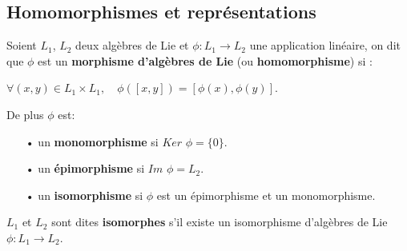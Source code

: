 \documentclass[a4paper,openany,12pt]{report}
\theoremstyle{break}
{\theorembodyfont{\upshape}
\newtheorem*{rmq}{Remarque :}
\newtheorem*{prv}{Preuve :}
\newtheorem*{ex}{Exemples :}
\newtheorem*{exe}{Exemple : }
\newtheorem*{nota}{Notation :}
\newtheorem*{dem}{D\'emonstration :}}
\begin{document}
\begin{ex}
\end{ex}

\subsection{Homomorphismes et représentations}

\begin{df}
Soient $L_{1}$, $L_{2}$ deux algèbres de Lie et $\phi: L_{1} \rightarrow L_{2}$ une application linéaire, on dit que $\phi$ est un \textbf{morphisme d'algèbres de Lie} (ou \textbf{homomorphisme}) si :
\begin{center}
$ \forall(x, y) \in L_{1} \times L_{1}, \quad \phi([x, y])=[\phi(x), \phi(y)]$.
\end{center}
De plus $\phi$ est:
\begin{itemize}
\item[•] un \textbf{monomorphisme} si $Ker$ $\phi = \{ 0 \}$.
\item[•] un \textbf{épimorphisme} si $Im$ $\phi = L_{2}$.
\item[•] un \textbf{isomorphisme} si $\phi$ est un épimorphisme et un monomorphisme.
\end{itemize}
$L_{1}$ et $L_{2}$ sont dites \textbf{isomorphes} s'il existe un isomorphisme d'algèbres de Lie $\phi: L_{1} \rightarrow L_{2}$.  
\end{df}
\end{document}
